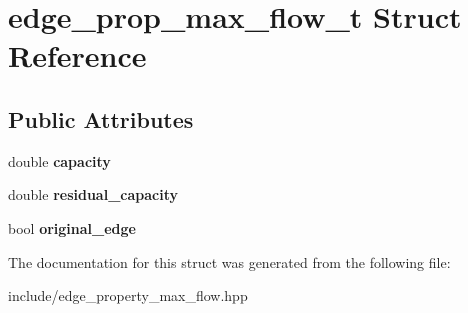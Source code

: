 \hypertarget{structedge__prop__max__flow__t}{
\section{edge\_\-prop\_\-max\_\-flow\_\-t Struct Reference}
\label{structedge__prop__max__flow__t}
}
\subsection*{Public Attributes}
\begin{DoxyCompactItemize}
\item 
\hypertarget{structedge__prop__max__flow__t_ab9327d96f83b603c8641661a37383559}{
double {\bfseries capacity}}
\label{structedge__prop__max__flow__t_ab9327d96f83b603c8641661a37383559}

\item 
\hypertarget{structedge__prop__max__flow__t_afbc4c3225a82ae95bd1eb724366b62e0}{
double {\bfseries residual\_\-capacity}}
\label{structedge__prop__max__flow__t_afbc4c3225a82ae95bd1eb724366b62e0}

\item 
\hypertarget{structedge__prop__max__flow__t_a72d9d421e60fe1fc3cfe59a35ef48697}{
bool {\bfseries original\_\-edge}}
\label{structedge__prop__max__flow__t_a72d9d421e60fe1fc3cfe59a35ef48697}

\end{DoxyCompactItemize}


The documentation for this struct was generated from the following file:\begin{DoxyCompactItemize}
\item 
include/edge\_\-property\_\-max\_\-flow.hpp\end{DoxyCompactItemize}
